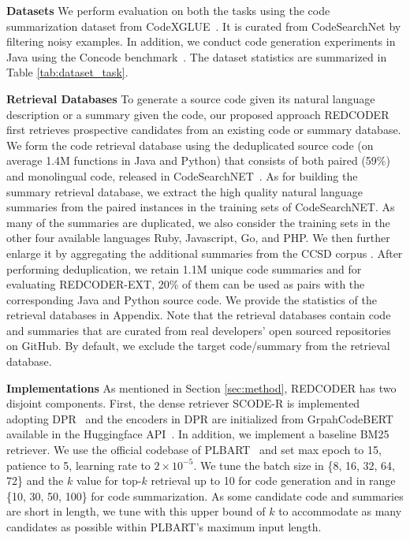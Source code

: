 \documentclass[11pt]{article}
\newcommand{\tool}{{REDCODER}\xspace}
\newcommand{\toolext}{{REDCODER-EXT}\xspace}
\newcommand{\coder}{SCODE-R\xspace}
\begin{document}
\noindent\textbf{Datasets\hspace{0.5em}} 
We perform evaluation on both the tasks using the code summarization dataset from CodeXGLUE~\cite{CodeXGLUE}.
It is curated from  CodeSearchNet \cite{husain2019codesearchnet} by filtering noisy examples.
In addition, we conduct code generation experiments in Java using the Concode benchmark~\cite{iyer-etal-2018-mapping}.
The dataset statistics are summarized in Table \ref{tab:dataset_task}. 


\smallskip\noindent\textbf{Retrieval Databases\hspace{0.5em}} 
To generate a source code given its natural language description or a summary given the code, our proposed approach \tool first retrieves prospective candidates from an existing code or summary database. 
We form the code retrieval database using the deduplicated source code (on average 1.4M functions in Java and Python) that consists of both paired (59\%) and monolingual code, released in CodeSearchNET~\cite{husain2019codesearchnet}. As for building the summary retrieval database, we extract the high quality natural language summaries from the paired instances in the training sets  of CodeSearchNET. As many of the summaries are duplicated, we also consider the training sets in the other four available languages Ruby, Javascript, Go, and PHP. We then further enlarge it by aggregating the additional summaries from the CCSD corpus \cite{liu2021retrievalaugmented}.
After performing deduplication, we retain 1.1M unique code summaries and for evaluating \toolext, 20\% of them can be used as pairs with the corresponding Java and Python source code. We provide the statistics of the retrieval databases in Appendix.
Note that the retrieval databases contain code and summaries that are curated from real developers' open sourced repositories on GitHub. 
By default, we exclude the target code/summary from the retrieval database. 


\smallskip\noindent\textbf{Implementations\hspace{0.5em}} 
As mentioned in Section \ref{sec:method}, \tool has two disjoint components.
First, the dense retriever \coder is implemented adopting DPR~\cite{karpukhin-etal-2020-dense} and the encoders in DPR are initialized from  GrpahCodeBERT available in the Huggingface API~\cite{wolf-etal-2020-transformers}. 
In addition, we implement a baseline BM25 retriever.
We use the official codebase of PLBART~\cite{ahmad2021unified} and set max epoch to 15, patience to 5, learning rate to $2\times 10^{-5}$.
We tune the batch size in \{8, 16, 32, 64, 72\} and the $k$ value for top-$k$ retrieval up to 10  for code generation and in range \{10, 30, 50, 100\} for code summarization. 
As some candidate code and summaries are short in length, we tune with this upper bound of $k$ to accommodate as many candidates as possible within PLBART's maximum input length.
\end{document}
